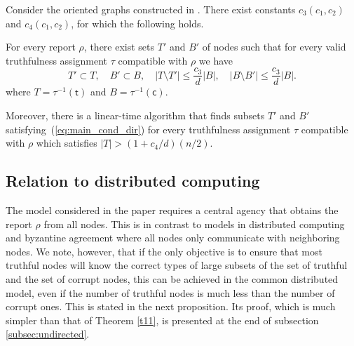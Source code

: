 \documentclass{toc}
\begin{document}
\begin{theorem}
\label{t15}
%
Consider the oriented graphs constructed in  . 
There exist
%
%
%
constants $c_3(c_1,c_2)$ and $c_4(c_1,c_2)$,
%
for which the following holds. 

%
For every report
$\rho$, there exist sets $T'$ and $B'$ of nodes
such that for every valid truthfulness assignment
$\tau$ compatible with $\rho$ we have
\begin{equation} \label{eq:main_cond_dir}
T' \subset T, \quad B' \subset B, \quad |T \setminus T'| \leq \frac{c_3}{d} |B| , \quad 
|B \setminus B'| \leq  \frac{c_3}{d} |B|. 
\end{equation}
where $T = \tau^{-1}(\mathsf{t})$ and $B =  \tau^{-1}(\mathsf{c})$.

%

Moreover, there is a linear-time
algorithm that finds subsets $T'$ and
$B'$ satisfying~(\ref{eq:main_cond_dir})
for every truthfulness assignment $\tau$
compatible with $\rho$ which
satisfies
$|T| >  (1 +  {c_4}/{d}) ({n}/{2})$.
%
\end{theorem}

%

\subsection{Relation to distributed computing} 
%
The model considered in the paper requires a central agency that 
obtains the report $\rho$ from all nodes. This is in contrast to models in 
distributed computing and byzantine agreement where all nodes 
only communicate with neighboring nodes. We note, however, that if the 
only objective is to ensure that most %
%
truthful nodes will know the correct
types of large subsets of the set of truthful and the set of
corrupt nodes, this can
be achieved in the common distributed model, even if the number
of truthful nodes is much less than the number of corrupt ones. This
is stated in the next proposition. Its proof, which is much simpler
than that of Theorem \ref{t11}, is presented at
the end of subsection \ref{subsec:undirected}.
%
\end{document}

